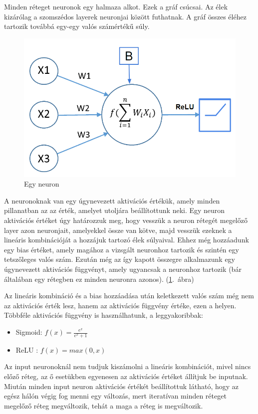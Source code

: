 Minden réteget neuronok egy halmaza alkot. Ezek a gráf csúcsai. Az élek kizárólag a szomszédos layerek neuronjai között futhatnak. A gráf összes éléhez tartozik továbbá egy-egy valós számértékű súly.

\begin{figure}[h!]
  
	\begin{center}
	\includegraphics[width=.6\linewidth]{neuron.png}
	\end{center}
	
  \caption{Egy neuron}\label{ab1.3}
\end{figure}

A neuronoknak van egy úgynevezett aktivációs értékük, amely minden pillanatban az az érték, amelyet utoljára beállítottunk neki. Egy neuron aktivációs értéket úgy határozzuk meg, hogy vesszük a neuron rétegét megelőző layer azon neuronjait, amelyekkel össze van kötve, majd vesszük ezeknek a lineáris kombinációját a hozzájuk tartozó élek súlyaival. Ehhez még hozzáadunk egy bias értéket, amely magához a vizsgált neuronhoz tartozik és szintén egy tetszőleges valós szám.
Ezután még az így kapott összegre alkalmazunk egy úgynevezett aktivációs függvényt, amely ugyancsak a neuronhoz tartozik (bár általában egy rétegben ez minden neuronra azonos).
(\ref{ab1.3}.~ábra)


Az lineáris kombináció és a bias hozzáadása után keletkezett valós szám még nem az aktivációs érték lesz, hanem az aktivációs függvény értéke, ezen a helyen.
Többféle aktivációs függvény is használhatunk, a leggyakoribbak:

\begin{itemize}  
	\item Sigmoid: $f(x) = \frac{e^x}{e^x+1}$ 
	\item ReLU : $f(x) = max(0,x)$
\end{itemize}

Az input neuronoknál nem tudjuk kiszámolni a lineáris kombinációt, mivel nincs előző réteg, az ő esetükben egyenesen az aktivációs értéket állítjuk be inputnak. Miután minden input neuron aktivációs értékét beállítottuk látható, hogy az egész hálón végig fog menni egy változás, mert iteratívan minden réteget megelőző réteg megváltozik, tehát a maga a réteg is megváltozik.

